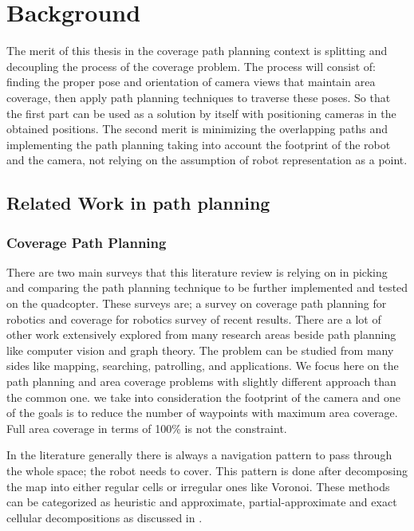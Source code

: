 \chapter{Background} \label{chap:background}


The merit of this thesis in the coverage path planning context is splitting and decoupling the process of the coverage problem. The process will consist of: finding the proper pose and orientation of camera views that maintain area coverage, then apply path planning techniques to traverse these poses. So that the first part can be used as a solution by itself with positioning cameras in the obtained positions. The second merit is minimizing the overlapping paths and implementing the path planning taking into account the footprint of the robot and the camera, not relying on the assumption of robot representation as a point. %

\section{Related Work in path planning}
\subsection{Coverage Path Planning}
There are two main surveys that this literature review is relying on in picking and comparing the path planning technique to be further implemented and tested on the quadcopter. These surveys are; a survey on coverage path planning for robotics \cite{CPP2} and coverage for robotics survey of recent results\cite{CPP1}. 
There are a lot of other work extensively explored from many research areas beside path planning like computer vision and graph theory. The problem can be studied from many sides like mapping, searching, patrolling, and applications. We focus here on the path planning and area coverage problems with slightly different approach than the common one. we take into consideration the footprint of the camera and one of the goals is to reduce the number of waypoints with maximum area coverage. Full area coverage in terms of 100\% is not the constraint.

In the literature generally there is always a navigation pattern to pass through the whole space; the robot needs to cover. This pattern is done after decomposing the map into either regular cells or irregular ones like Voronoi. These methods can be categorized as heuristic and approximate, partial-approximate and exact cellular decompositions as discussed in \cite{CPP1}.

